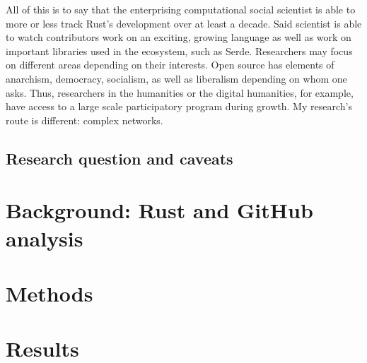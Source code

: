 \documentclass[12pt, a4paper]{article}
\begin{document}
All of this is to say that the enterprising computational social scientist is able to more or less track Rust's development over at least a decade. Said scientist is able to watch contributors work on an exciting, growing language as well as work on important libraries used in the ecosystem, such as Serde. Researchers may focus on different areas depending on their interests. Open source has elements of anarchism, democracy, socialism, as well as liberalism depending on whom one asks. Thus, researchers in the humanities or the digital humanities, for example, have access to a large scale participatory program during growth. My research's route is different: complex networks.

\subsection{Research question and caveats}

\section{Background: Rust and GitHub analysis}

\section{Methods}

\section{Results}
\end{document}
